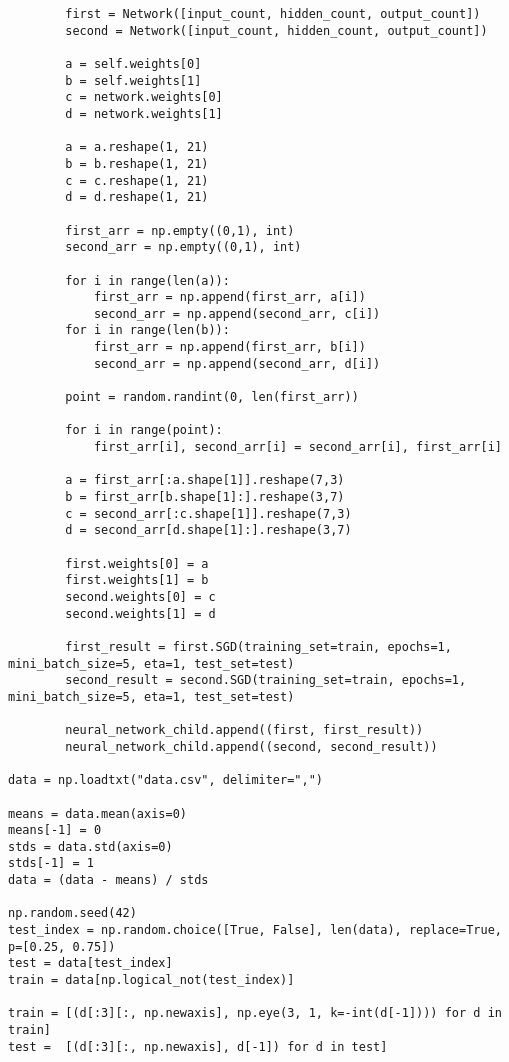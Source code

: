 \begin{lstlisting}
        first = Network([input_count, hidden_count, output_count])
        second = Network([input_count, hidden_count, output_count])
        
        a = self.weights[0]
        b = self.weights[1]
        c = network.weights[0]
        d = network.weights[1]
                
        a = a.reshape(1, 21)
        b = b.reshape(1, 21)
        c = c.reshape(1, 21)
        d = d.reshape(1, 21)
        
        first_arr = np.empty((0,1), int)
        second_arr = np.empty((0,1), int)

        for i in range(len(a)):
            first_arr = np.append(first_arr, a[i])
            second_arr = np.append(second_arr, c[i])
        for i in range(len(b)):
            first_arr = np.append(first_arr, b[i])
            second_arr = np.append(second_arr, d[i])
        
        point = random.randint(0, len(first_arr))
    
        for i in range(point):
            first_arr[i], second_arr[i] = second_arr[i], first_arr[i]
            
        a = first_arr[:a.shape[1]].reshape(7,3)
        b = first_arr[b.shape[1]:].reshape(3,7)
        c = second_arr[:c.shape[1]].reshape(7,3)
        d = second_arr[d.shape[1]:].reshape(3,7)
        
        first.weights[0] = a
        first.weights[1] = b
        second.weights[0] = c
        second.weights[1] = d
        
        first_result = first.SGD(training_set=train, epochs=1, mini_batch_size=5, eta=1, test_set=test)
        second_result = second.SGD(training_set=train, epochs=1, mini_batch_size=5, eta=1, test_set=test)
        
        neural_network_child.append((first, first_result))
        neural_network_child.append((second, second_result))

data = np.loadtxt("data.csv", delimiter=",")

means = data.mean(axis=0)
means[-1] = 0 
stds = data.std(axis=0)
stds[-1] = 1
data = (data - means) / stds

np.random.seed(42)
test_index = np.random.choice([True, False], len(data), replace=True, p=[0.25, 0.75])
test = data[test_index]
train = data[np.logical_not(test_index)]

train = [(d[:3][:, np.newaxis], np.eye(3, 1, k=-int(d[-1]))) for d in train]
test =  [(d[:3][:, np.newaxis], d[-1]) for d in test]


\end{lstlisting}
